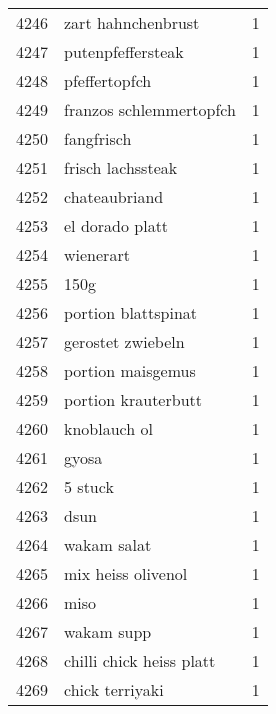 \begin{tabular}{llr}
4246 &                                 zart hahnchenbrust &      1 \\
4247 &                                  putenpfeffersteak &      1 \\
4248 &                                      pfeffertopfch &      1 \\
4249 &                            franzos schlemmertopfch &      1 \\
4250 &                                         fangfrisch &      1 \\
4251 &                                  frisch lachssteak &      1 \\
4252 &                                      chateaubriand &      1 \\
4253 &                                    el dorado platt &      1 \\
4254 &                                          wienerart &      1 \\
4255 &                                               150g &      1 \\
4256 &                                portion blattspinat &      1 \\
4257 &                                  gerostet zwiebeln &      1 \\
4258 &                                  portion maisgemus &      1 \\
4259 &                                portion krauterbutt &      1 \\
4260 &                                       knoblauch ol &      1 \\
4261 &                                              gyosa &      1 \\
4262 &                                            5 stuck &      1 \\
4263 &                                               dsun &      1 \\
4264 &                                        wakam salat &      1 \\
4265 &                                 mix heiss olivenol &      1 \\
4266 &                                               miso &      1 \\
4267 &                                         wakam supp &      1 \\
4268 &                           chilli chick heiss platt &      1 \\
4269 &                                    chick terriyaki &      1 \\

\end{tabular}
